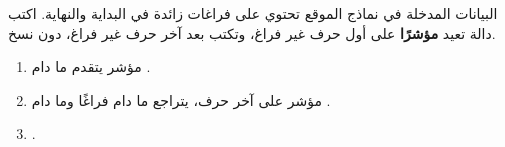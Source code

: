 \begin{statement}
البيانات المدخلة في نماذج الموقع تحتوي على فراغات زائدة في البداية والنهاية. اكتب دالة  تعيد \textbf{مؤشرًا} على أول حرف غير فراغ، وتكتب  بعد آخر حرف غير فراغ، دون نسخ.
\end{statement}
\begin{stepsbox}\begin{enumerate}
\item مؤشر  يتقدم ما دام .
\item مؤشر  على آخر حرف، يتراجع ما دام فراغًا وما دام .
\item {}.
\end{enumerate}\end{stepsbox}
